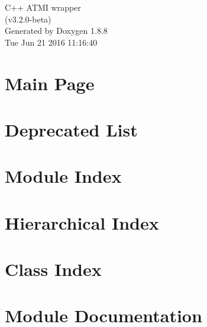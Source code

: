 \documentclass[twoside]{book}
\newcommand{\+}{\discretionary{\mbox{\scriptsize$\hookleftarrow$}}{}{}}
\newcommand{\clearemptydoublepage}{%
  \newpage{\pagestyle{empty}\cleardoublepage}%
}
\begin{document}
\hypersetup{pageanchor=false,
             bookmarks=true,
             bookmarksnumbered=true,
             pdfencoding=unicode
            }
\begin{titlepage}
\vspace*{7cm}
\begin{center}%
{\Large C++ A\+T\+M\+I wrapper \\[1ex]\large (v3.\+2.\+0-\/beta) }\\
\vspace*{1cm}
{\large Generated by Doxygen 1.8.8}\\
\vspace*{0.5cm}
{\small Tue Jun 21 2016 11:16:40}\\
\end{center}
\end{titlepage}
\clearemptydoublepage
\tableofcontents
\clearemptydoublepage
{}
\hypersetup{pageanchor=true}

\chapter{Main Page}
\label{index}\hypertarget{index}{}
\chapter{Deprecated List}
\label{deprecated}
\hypertarget{deprecated}{}

\chapter{Module Index}

\chapter{Hierarchical Index}

\chapter{Class Index}

\chapter{Module Documentation}



\end{document}
